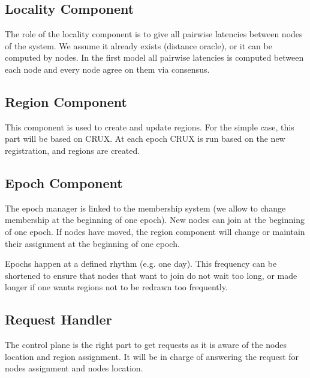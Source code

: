 \documentclass[a4paper,11pt,oneside]{report}
\begin{document}
\subsection{Locality Component}

 The role of the locality component is to give all pairwise latencies between
 nodes of the system. We assume it already exists (distance oracle), or it can
 be computed by nodes. In the first model all pairwise latencies is computed
 between each node and every node agree on them via consensus. 
 
 \subsection{Region Component} This component is used to create and update
 regions. For the simple case, this part will be based on CRUX. At each epoch
 CRUX is run based on the new registration, and regions are created.
 
 \subsection{Epoch Component} The epoch manager is linked to the membership
 system (we allow to change membership at the beginning of one epoch). New
 nodes can join at the beginning of one epoch. If nodes have moved, the region
 component will change or maintain their assignment at the beginning of one
 epoch. 

Epochs happen at a defined rhythm (e.g. one day). This frequency can be
shortened to ensure that nodes that want to join do not wait too long, or made
longer if one wants regions not to be redrawn too frequently. 

\subsection{Request Handler} The control plane is the right part to get
requests as it is aware of the nodes location and region assignment. It will be
in charge of answering the request for nodes assignment and nodes location. 
\end{document}
